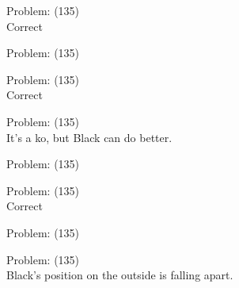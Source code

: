 \documentclass[11pt]{article}
\begin{document}
\begin{minipage}[t]{0.5\textwidth}
  {\centering
  
Problem: (135)\\
Correct\\
  }
\end{minipage}
\begin{minipage}[t]{0.5\textwidth}
  {\centering
  
Problem: (135)\\
  }
\end{minipage}
\begin{minipage}[t]{0.5\textwidth}
  {\centering
  
Problem: (135)\\
Correct\\
  }
\end{minipage}
\begin{minipage}[t]{0.5\textwidth}
  {\centering
  
Problem: (135)\\
It's a ko, but Black can do better.\\
  }
\end{minipage}
\begin{minipage}[t]{0.5\textwidth}
  {\centering
  
Problem: (135)\\
  }
\end{minipage}
\begin{minipage}[t]{0.5\textwidth}
  {\centering
  
Problem: (135)\\
Correct\\
  }
\end{minipage}
\begin{minipage}[t]{0.5\textwidth}
  {\centering
  
Problem: (135)\\
  }
\end{minipage}
\begin{minipage}[t]{0.5\textwidth}
  {\centering
  
Problem: (135)\\
Black's position on the outside is falling apart.\\
  }
\end{minipage}
\end{document}

